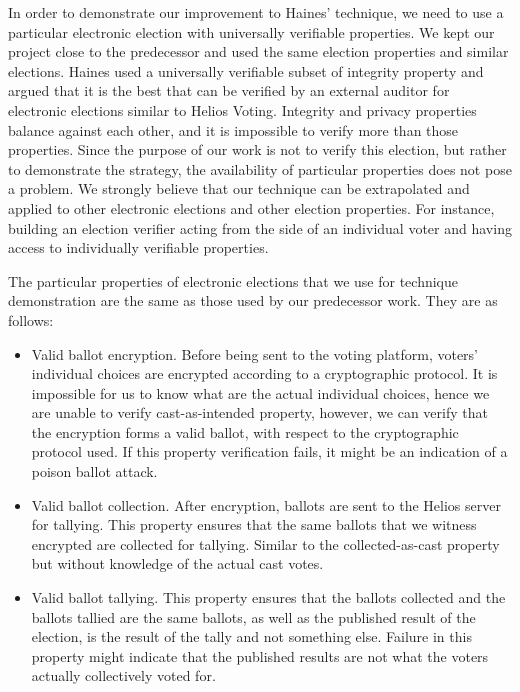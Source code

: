     In order to demonstrate our improvement to Haines' technique, we need to use a particular electronic election with universally verifiable properties. We kept our project close to the predecessor and used the same election properties and similar elections. Haines used a universally verifiable subset of integrity property and argued that it is the best that can be verified by an external auditor for electronic elections similar to Helios Voting. Integrity and privacy properties balance against each other, and it is impossible to verify more than those properties. Since the purpose of our work is not to verify this election, but rather to demonstrate the strategy, the availability of particular properties does not pose a problem. We strongly believe that our technique can be extrapolated and applied to other electronic elections and other election properties. For instance, building an election verifier acting from the side of an individual voter and having access to individually verifiable properties.

    The particular properties of electronic elections that we use for technique demonstration are the same as those used by our predecessor work. They are as follows:
    
    \begin{itemize}
            \item Valid ballot encryption. Before being sent to the voting platform, voters' individual choices are encrypted according to a cryptographic protocol. It is impossible for us to know what are the actual individual choices, hence we are unable to verify cast-as-intended property, however, we can verify that the encryption forms a valid ballot, with respect to the cryptographic protocol used. If this property verification fails, it might be an indication of a poison ballot attack. 
            \item Valid ballot collection. After encryption, ballots are sent to the Helios server for tallying. This property ensures that the same ballots that we witness encrypted are collected for tallying. Similar to the collected-as-cast property but without knowledge of the actual cast votes. 
            \item Valid ballot tallying. This property ensures that the ballots collected and the ballots tallied are the same ballots, as well as the published result of the election, is the result of the tally and not something else. Failure in this property might indicate that the published results are not what the voters actually collectively voted for.
    \end{itemize}

